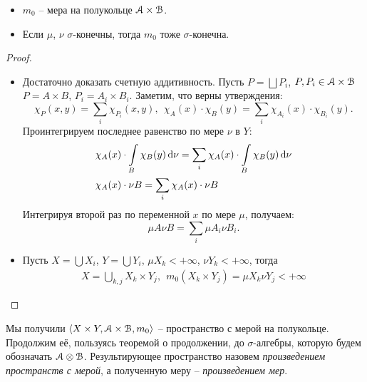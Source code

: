 \begin{theorem}
    \enewline
    \begin{itemize}
        \item $m_0$ -- мера на полукольце $\mathcal{A} \times \mathcal{B}$.
        \item Если $\mu$, $\nu$ $\sigma$-конечны, тогда $m_0$ тоже $\sigma$-конечна.
    \end{itemize} 
\end{theorem}
\begin{proof}
    \enewline
    \begin{itemize}
        \item Достаточно доказать счетную аддитивность. Пусть $P = \bigsqcup{P_i}$, $P, P_i \in \mathcal{A} \times \mathcal{B}$
            $P = A \times B$, $P_i = A_i \times B_i$. Заметим, что верны утверждения:
            \[
                \chi_P(x, y) = \sum_{i}{\chi_{P_i}(x, y)},~~
                \chi_A(x) \cdot \chi_B(y) = \sum_{i}{\chi_{A_i}(x) \cdot \chi_{B_i}(y)}
            .\]            
            Проинтегрируем последнее равенство по мере $\nu$ в $Y$:
            \begin{align*}
            &\chi_A(x) \cdot \int\limits_B{\chi_B(y) \,\mathrm{d}\nu} = \sum_{i}{\chi_A(x) \cdot \int\limits_B{\chi_B(y) \,\mathrm{d}\nu}} \\
            &\chi_A(x) \cdot \nu{B} = \sum_{i}{\chi_A(x) \cdot \nu{B}}
            \end{align*}
            Интегрируя второй раз по переменной $x$ по мере $\mu$, получаем:
            \[
                \mu{A} \nu{B} = \sum_{i}{\mu{A_i} \nu{B_i}}
            .\]
        \item Пусть $X = \bigcup{X_i}$, $Y = \bigcup{Y_i}$, $\mu{X_k} < +\infty$, $\nu{Y_k} < +\infty$, 
            тогда 
            \begin{align*}
                X = \bigcup_{k, j}{X_k \times Y_j},~~ m_0(X_k \times Y_j) = \mu{X_k} \nu{Y_j} < +\infty
            \end{align*}
    \end{itemize}
\end{proof}

\begin{definition}

    Мы получили $\langle X \times Y, \mathcal{A} \times \mathcal{B}, m_0 \rangle$ -- пространство с
    мерой на полукольце. Продолжим её, пользуясь теоремой о продолжении,
    до $\sigma$-алгебры, которую будем обозначать $\mathcal{A} \otimes \mathcal{B}$. Результирующее пространство
    назовем \textit{произведением пространств с мерой}, а полученную меру -- \textit{произведением мер}.
\end{definition}

